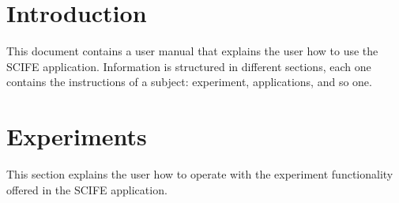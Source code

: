 \documentclass[11pt]{article}
\begin{document}
\newpage
\thispagestyle{empty}
\tableofcontents
\clearpage
\thispagestyle{empty}
\listoffigures
\clearpage
\setcounter{page}{1}

\section{Introduction}
This document contains a user manual that explains the user how to use the SCIFE application. Information is structured in different sections, each one contains the instructions of a subject: experiment, applications, and so one.

\section{Experiments}
This section explains the user how to operate with the experiment functionality offered in the SCIFE application.
\end{document}
